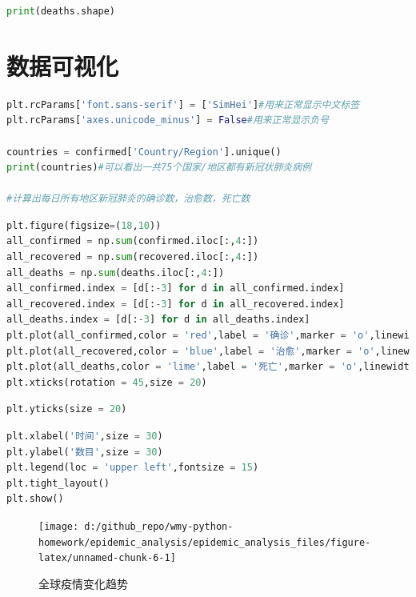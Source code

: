 \documentclass[UTF8,a4paper,12pt]{ctexart}  %
\begin{document}
\begin{lstlisting}[language=Python]
print(deaths.shape)
\end{lstlisting}

\section{数据可视化}

\begin{lstlisting}[language=Python]
plt.rcParams['font.sans-serif'] = ['SimHei']#用来正常显示中文标签
plt.rcParams['axes.unicode_minus'] = False#用来正常显示负号

countries = confirmed['Country/Region'].unique()
print(countries)#可以看出一共75个国家/地区都有新冠状肺炎病例

#计算出每日所有地区新冠肺炎的确诊数，治愈数，死亡数
\end{lstlisting}

\begin{lstlisting}[language=Python]
plt.figure(figsize=(18,10))
all_confirmed = np.sum(confirmed.iloc[:,4:])
all_recovered = np.sum(recovered.iloc[:,4:])
all_deaths = np.sum(deaths.iloc[:,4:])
all_confirmed.index = [d[:-3] for d in all_confirmed.index]
all_recovered.index = [d[:-3] for d in all_recovered.index]
all_deaths.index = [d[:-3] for d in all_deaths.index]
plt.plot(all_confirmed,color = 'red',label = '确诊',marker = 'o',linewidth=2,markersize=3)
plt.plot(all_recovered,color = 'blue',label = '治愈',marker = 'o',linewidth=2,markersize=3)
plt.plot(all_deaths,color = 'lime',label = '死亡',marker = 'o',linewidth=2,markersize=3)
plt.xticks(rotation = 45,size = 20)
\end{lstlisting}

\begin{lstlisting}[language=Python]
plt.yticks(size = 20)
\end{lstlisting}

\begin{lstlisting}[language=Python]
plt.xlabel('时间',size = 30)
plt.ylabel('数目',size = 30)
plt.legend(loc = 'upper left',fontsize = 15)
plt.tight_layout()
plt.show()
\end{lstlisting}

\begin{figure}

{\centering \texttt{[image: d:/github\_repo/wmy-python-homework/epidemic\_analysis/epidemic\_analysis\_files/figure-latex/unnamed-chunk-6-1]} 

}

\caption{全球疫情变化趋势}\label{fig:unnamed-chunk-6}
\end{figure}
\end{document}
